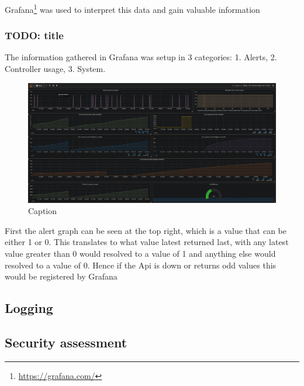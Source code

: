 \documentclass[report/main.tex]{subfiles}
\begin{document}
                Grafana\footnote{\hyperlink{https://grafana.com/}{https://grafana.com/}} was used to interpret this data and gain valuable information
            
            \subsubsection{TODO: title}
                The information gathered in Grafana was setup in 3 categories: 1. Alerts, 2. Controller usage, 3. System.
                
                \begin{figure}[H]
                    \centering
                    \includegraphics[width=\textwidth]{report/images/Grafana Setup.jpg}
                    \caption{Caption}
                    \label{fig:grafana_setup}
                \end{figure}
            
                First the alert graph can be seen at the top right, which is a value that can be either 1 or 0. This translates to what value latest returned last, with any latest value greater than 0 would resolved to a value of 1 and anything else would resolved to a value of 0. Hence if the Api is down or returns odd values this would be registered by Grafana
            
        \subsection{Logging}
        
        \subsection{Security assessment}
            
\end{document}
